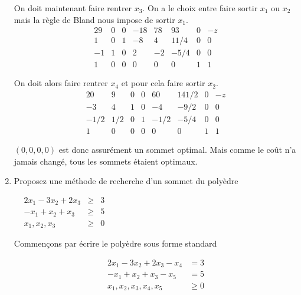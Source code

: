 \begin{enumerate}
\begin{solution}
      On doit maintenant faire rentrer $x_3$.
      On a le choix entre faire sortir $x_1$ ou $x_2$ mais la
      règle de Bland nous impose de sortir $x_1$.
      \[
        \begin{array}{ccccccc|l}
          29 & 0 & 0 & -18 & 78 & 93   & 0 & -z\\
          \hline
           1 & 0 & 1 &  -8 &  4 & 11/4 & 0 & 0\\
          -1 & 1 & 0 &   2 & -2 & -5/4 & 0 & 0\\
           1 & 0 & 0 &   0 &  0 &  0   & 1 & 1
        \end{array}
      \]

      On doit alors faire rentrer $x_4$ et pour cela faire sortir
      $x_2$.
      \[
        \begin{array}{ccccccc|l}
          20   & 9   & 0 & 0 & 60   & 141/2 & 0 & -z\\
          \hline
          -3   & 4   & 1 & 0 & -4   & -9/2  & 0 & 0\\
          -1/2 & 1/2 & 0 & 1 & -1/2 & -5/4  & 0 & 0\\
           1   & 0   & 0 & 0 &  0   &  0    & 1 & 1
        \end{array}
      \]

      $(0,0,0,0)$ est donc assurément un sommet optimal.
      Mais comme le coût n'a jamais changé, tous les sommets
      étaient optimaux.

    \end{solution}

  \item Proposez une méthode de recherche d'un sommet du polyèdre

    $
    \begin{array}{lrcr}
      & 2x_1-3x_2 +2x_3 & \geq & 3\\
      & -x_1+x_2 +x_3 & \geq & 5\\
      & x_1, x_2, x_3 & \geq & 0
    \end{array}
    $

    \begin{solution}
      Commençons par écrire le polyèdre sous forme standard

      \begin{align*}
        2x_1 - 3x_2 + 2x_3 - x_4 & = 3\\
        -x_1 +  x_2 +  x_3 - x_5 & = 5\\
         x_1, x_2, x_3, x_4, x_5 & \geq 0
      \end{align*}


\end{solution}
\end{enumerate}
